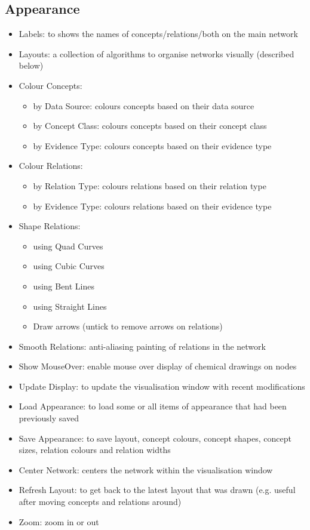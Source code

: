 \subsection{Appearance} 
\label{sec:menu_app}
\begin{itemize}
\item Labels: to shows the names of concepts/relations/both on the main network
\item Layouts: a collection of algorithms to organise networks visually (described below)
\item Colour Concepts:
 \begin{itemize}
 \item by Data Source:
 colours concepts based on their data source
 \item by Concept Class:
 colours concepts based on their concept class
 \item by Evidence Type:
 colours concepts based on their evidence type
 \end{itemize}
\item Colour Relations:
 \begin{itemize}
 \item by Relation Type:
 colours relations based on their relation type
 \item by Evidence Type:
 colours relations based on their evidence type
 \end{itemize}
\item Shape Relations:
\begin{itemize}
 \item using Quad Curves
 \item using Cubic Curves
 \item using Bent Lines
 \item using Straight Lines
 \item Draw arrows (untick to remove arrows on relations)
 \end{itemize}
\item Smooth Relations: anti-aliasing painting of relations in the network
\item Show MouseOver: enable mouse over display of chemical drawings on nodes
\item Update Display: to update the visualisation window with recent modifications
\item Load Appearance: to load some or all items of appearance that had been previously saved
\item Save Appearance: to save layout, concept colours, concept shapes, concept sizes, relation colours and relation widths
\item Center Network: centers the network within the visualisation window
\item Refresh Layout: to get back to the latest layout that was drawn (e.g. useful after moving concepts and relations around)
\item Zoom: zoom in or out
\end{itemize}


